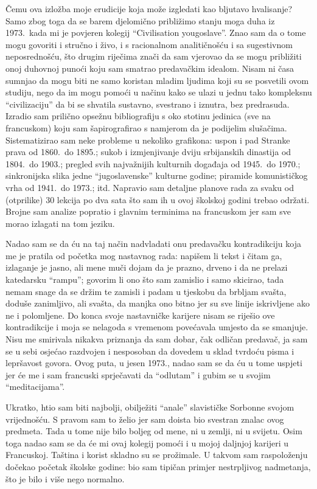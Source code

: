 \documentclass[a4paper,12pt,twoside]{report}
\begin{document}
Čemu ova izložba moje erudicije koja može izgledati kao bljutavo hvalisanje? Samo zbog toga da se barem djelomično približimo stanju moga duha iz 1973.\ kada mi je povjeren kolegij ``Civilisation yougoslave''. Znao sam da o tome mogu govoriti i stručno i živo, i s racionalnom analitičnošću i sa sugestivnom neposrednošću, što drugim riječima znači da sam vjerovao da se mogu približiti onoj duhovnoj punoći koju sam smatrao predavačkim idealom. Nisam ni časa sumnjao da mogu biti ne samo koristan mladim ljudima koji su se posvetili ovom studiju, nego da im mogu pomoći u načinu kako se ulazi u jednu tako kompleksnu ``civilizaciju'' da bi se shvatila sustavno, svestrano i iznutra, bez predrasuda. Izradio sam prilično opsežnu bibliografiju s oko stotinu jedinica (sve na francuskom) koju sam šapirografirao s namjerom da je podijelim slušačima. Sistematizirao sam neke probleme u nekoliko grafikona: uspon i pad Stranke prava od 1860.\ do 1895.; sukob i izmjenjivanje dviju srbijanskih dinastija od 1804.\ do 1903.; pregled svih najvažnijih kulturnih događaja od 1945.\ do 1970.; sinkronijska slika jedne ``jugoslavenske'' kulturne godine; piramide komunističkog vrha od 1941.\ do 1973.; itd. Napravio sam detaljne planove rada za svaku od (otprilike) 30 lekcija po dva sata što sam ih u ovoj školskoj godini trebao održati. Brojne sam analize popratio i glavnim terminima na francuskom jer sam sve morao izlagati na tom jeziku.

Nadao sam se da ću na taj način nadvladati onu predavačku kontradikciju koja me je pratila od početka mog nastavnog rada: napišem li tekst i čitam ga, izlaganje je jasno, ali mene muči dojam da je prazno, drveno i da ne prelazi katedarsku ``rampu''; govorim li ono što sam zamislio i samo skicirao, tada nemam snage da se držim te zamisli i padam u tjeskobu da brbljam svašta, doduše zanimljivo, ali svašta, da manjka ono bitno jer su sve linije iskrivljene ako ne i polomljene. Do konca svoje nastavničke karijere nisam se riješio ove kontradikcije i moja se nelagoda s vremenom povećavala umjesto da se smanjuje. Nisu me smirivala nikakva priznanja da sam dobar, čak odličan predavač, ja sam se u sebi osjećao razdvojen i nesposoban da dovedem u sklad tvrdoću pisma i lepršavost govora. Ovog puta, u jesen 1973., nadao sam se da ću u tome uspjeti jer će me i sam francuski sprječavati da ``odlutam'' i gubim se u svojim ``meditacijama''.

Ukratko, htio sam biti najbolji, obilježiti ``anale'' slavističke Sorbonne svojom vrijednošću. S pravom sam to želio jer sam doista bio svestran znalac ovog predmeta. Tada u tome nije bilo boljeg od mene, ni u zemlji, ni u svijetu. Osim toga nadao sam se da će mi ovaj kolegij pomoći i u mojoj daljnjoj karijeri u Francuskoj. Taština i korist skladno su se prožimale. U takvom sam raspoloženju dočekao početak školske godine: bio sam tipičan primjer nestrpljivog nadmetanja, što je bilo i više nego normalno.

\tableofcontents
\end{document}
